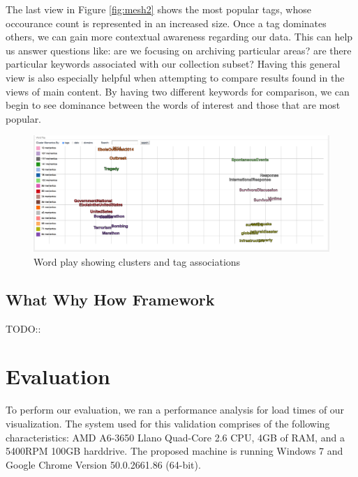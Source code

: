 \documentclass[10pt,journal,compsoc]{IEEEtran}
\begin{document}
The last view in Figure \ref{fig:mesh2} shows the most popular tags, whose occourance count is represented in an increased size. Once a tag dominates others, we can gain more contextual awareness regarding our data. This can help us answer questions like: are we focusing on archiving particular areas? are there particular keywords associated with our collection subset? Having this general view is also especially helpful when attempting to compare results found in the views of main content. By having two different keywords for comparison, we can begin to see dominance between the words of interest and those that are most popular. \par

\begin{figure}
\centering
\includegraphics[width=\textwidth]{Figure6}
\caption{Word play showing clusters and tag associations}
\label{fig:mesh6}
\end{figure}


\subsection{What Why How Framework}
TODO::

\section{Evaluation}

To perform our evaluation, we ran a performance analysis for load times of our visualization. The system used for this validation comprises of the following characteristics: AMD A6-3650 Llano Quad-Core 2.6 CPU, 4GB of RAM, and a 5400RPM 100GB harddrive. The proposed machine is running Windows 7 and Google Chrome Version 50.0.2661.86 (64-bit). \par
\end{document}
